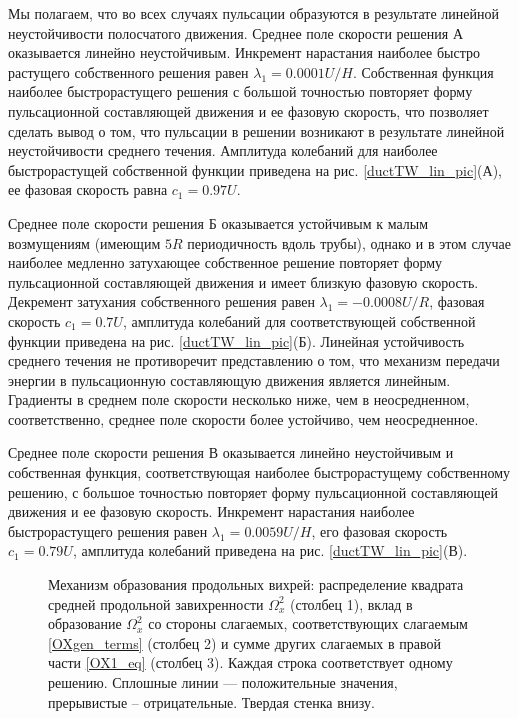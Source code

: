 Мы полагаем, что во всех случаях пульсации образуются в результате линейной неустойчивости полосчатого движения. 
Среднее поле скорости решения А оказывается линейно неустойчивым. Инкремент нарастания наиболее быстро растущего собственного решения равен $\lambda_1 = 0.0001U/H$. Собственная функция наиболее быстрорастущего решения с большой точностью повторяет форму пульсационной составляющей движения и ее фазовую скорость, что позволяет сделать вывод о том, что пульсации в решении возникают в результате линейной неустойчивости среднего течения. Амплитуда колебаний для наиболее быстрорастущей собственной функции приведена на рис. \ref{ductTW_lin_pic}(А), ее фазовая скорость равна $c_1=0.97U$. 

Среднее поле скорости решения Б оказывается устойчивым к малым возмущениям (имеющим $5R$ периодичность вдоль трубы), однако и в этом случае наиболее медленно затухающее собственное решение повторяет форму пульсационной составляющей движения и имеет близкую фазовую скорость. Декремент затухания собственного решения равен $\lambda_1 = -0.0008U/R$, фазовая скорость $c_1 = 0.7U$, амплитуда колебаний для соответствующей собственной функции приведена на рис. \ref{ductTW_lin_pic}(Б). Линейная устойчивость среднего течения не противоречит представлению о том, что механизм передачи энергии в пульсационную составляющую движения является линейным. Градиенты в среднем поле скорости несколько ниже, чем в неосредненном, соответственно, среднее поле скорости более устойчиво, чем неосредненное. 

Среднее поле скорости решения В оказывается линейно неустойчивым и собственная функция, соответствующая наиболее быстрорастущему собственному решению, с большое точностью повторяет форму пульсационной составляющей движения и ее фазовую скорость. Инкремент нарастания наиболее быстрорастущего решения равен $\lambda_1 = 0.0059U/H$, его фазовая скорость $c_1 = 0.79U$, амплитуда колебаний приведена на рис. \ref{ductTW_lin_pic}(В). 

\begin{figure}
\caption{Механизм образования продольных вихрей: распределение квадрата средней продольной завихренности $\Omega_x^2$ (столбец 1), вклад в образование $\Omega_x^2$ со стороны слагаемых, соответствующих слагаемым \eqref{OXgen_terms} (столбец 2) и сумме других слагаемых в правой части \eqref{OX1_eq} (столбец 3). Каждая строка соответствует одному решению. Сплошные линии --- положительные значения, прерывистые -- отрицательные. Твердая стенка внизу.}
\label{ductTW_OXgen_pic}
\end{figure}


